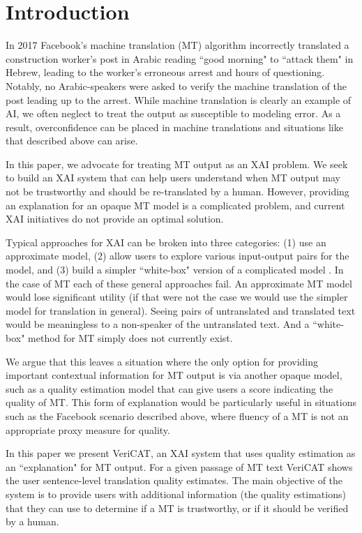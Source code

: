 \section{Introduction}

In 2017 Facebook's machine translation (MT) algorithm incorrectly translated a construction worker's post in Arabic reading ``good morning" to ``attack them" in Hebrew, leading to the worker's erroneous arrest and hours of questioning. Notably, no Arabic-speakers were asked to verify the machine translation of the  post leading up to the arrest\cite{hernFacebook2017}. While machine translation is clearly an example of AI, we often neglect to treat the output as susceptible to modeling error. As a result, overconfidence can be placed in machine translations and situations like that described above can arise. 

In this paper, we advocate for treating MT output as an XAI problem. We seek to build an XAI system that can help users understand when MT output may not be trustworthy and should be re-translated by a human. However, providing an explanation for an opaque  MT model is a complicated problem, and current XAI initiatives do not provide an optimal solution.   

Typical approaches for XAI can be broken into three categories: (1) use an approximate model, (2) allow users to explore various input-output pairs for the model, and (3) build a simpler ``white-box" version of a complicated model . In the case of MT each of these general approaches fail. An approximate MT model would lose significant utility (if that were not the case we would use the simpler model for translation in general). Seeing pairs of untranslated and translated text would be meaningless to a non-speaker of the untranslated text. And a ``white-box" method for MT simply does not currently exist.      

We argue that this leaves a situation where the only option for providing important contextual information for MT output is via another opaque model, such as a quality estimation model that can give users a score indicating the quality of MT. This form of explanation would be particularly useful in situations such as the Facebook scenario described above, where fluency of a MT is not an appropriate proxy measure for quality. 

In this paper we present VeriCAT, an XAI system that uses quality estimation as an ``explanation" for MT output. For a given passage of MT text VeriCAT shows the user sentence-level translation quality estimates. The main objective of the system is to provide users with additional information (the quality estimations) that they can use to determine if a MT is trustworthy, or if it should be verified by a human. 

